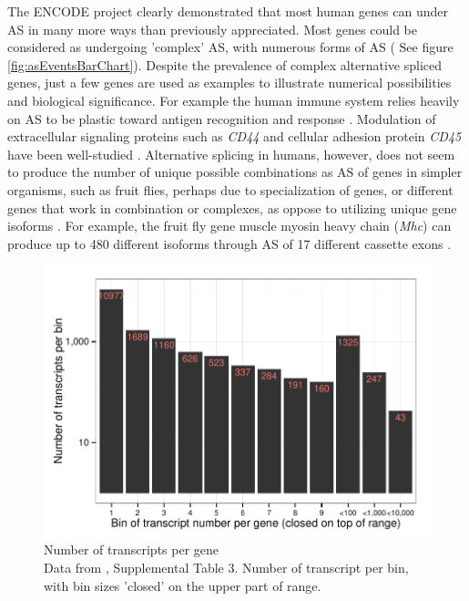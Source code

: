 The ENCODE project clearly demonstrated that most human genes can under AS in many more ways than previously appreciated. Most genes could be considered as undergoing 'complex' AS, with numerous forms of AS ( See figure \ref{fig:asEventsBarChart}). Despite the prevalence of complex alternative spliced genes, just a few genes are used as examples to illustrate numerical possibilities and biological significance. For example the human immune system relies heavily on AS to be plastic toward antigen recognition and response \citep{Lynch2004}. Modulation of extracellular signaling proteins such as \textit{CD44} and cellular adhesion protein \textit{CD45} have been well-studied \citep{Zikherman2008,Ponta2003b}. Alternative splicing in humans, however, does not seem to produce the number of unique possible combinations as AS of genes in simpler organisms, such as fruit flies, perhaps due to specialization of genes, or different genes that work in combination or complexes, as oppose to utilizing unique gene isoforms \citep{Park2007}. For example, the fruit fly gene muscle myosin heavy chain (\textit{Mhc}) can produce up to 480 different isoforms through AS of 17 different cassette exons \citep{Bernstein1983a}.  

\begin{figure}[htbp]
	\centering 
	\includegraphics{Figures/NumberOFTranscriptsPerFlyGene.pdf}
	\caption[Number of transcripts per \flies{} gene]
	{
		Number of transcripts per \flies{} gene\\[0.25cm]
		Data from \citep{Brown2014}, Supplemental Table 3. Number of transcript per bin, with bin sizes 'closed' on the upper part of range.
	}
	\label{fig:txPerFlyGene}
\end{figure}


